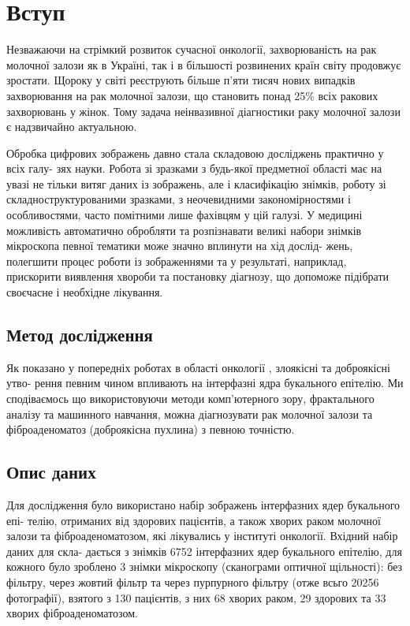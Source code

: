 
\chapter{Вступ} %

\label{Chapter1} %

Незважаючи на стрімкий розвиток сучасної онкології, захворюваність на рак молочної залози як в Україні, так і в більшості розвинених країн світу продовжує зростати. Щороку у світі реєструють більше п’яти тисяч нових випадків захворювання на рак молочної залози, що становить понад 25\% всіх ракових захворювань у жінок. Тому задача неінвазивної діагностики раку молочної залози є надзвичайно актуальною.

Обробка цифрових зображень давно стала складовою досліджень практично у всіх галу- зях науки. Робота зі зразками з будь-якої предметної області має на увазі не тільки витяг даних із зображень, але і класифікацію знімків, роботу зі складноструктурованими зразками, з неочевидними закономірностями і особливостями, часто помітними лише фахівцям у цій галузі. У медицині можливість автоматично обробляти та розпізнавати великі набори знімків мікроскопа певної тематики може значно вплинути на хід дослід- жень, полегшити процес роботи із зображеннями та у результаті, наприклад, прискорити виявлення хвороби та постановку діагнозу, що допоможе підібрати своєчасне і необхідне лікування.


\section{Метод дослідження}

Як показано у попередніх роботах в області онкології \citep{bib:the_beginning}, злоякісні та доброякісні утво- рення певним чином впливають на інтерфазні ядра букального епітелію. Ми сподіваємось що використовуючи методи комп'ютерного зору, фрактального аналізу та машинного навчання, можна діагнозувати рак молочної залози та фіброаденоматоз (доброякісна пухлина) з певною точністю.

\section{Опис даних}

Для дослідження було використано набір зображень інтерфазних ядер букального епі- телію, отриманих від здорових пацієнтів, а також хворих раком молочної залози та фіброаденоматозом, які лікувались у інституті онкології. Вхідний набір даних для скла- дається з знімків 6752 інтерфазних ядер букального епітелію, для кожного було зроблено 3 знімки мікроскопу (сканограми оптичної щільності): без фільтру, через жовтий фільтр та через пурпурного фільтру (отже всьго 20256 фотографії), взятого з 130 пацієнтів, з них 68 хворих раком, 29 здорових та 33 хворих фіброаденоматозом. 
